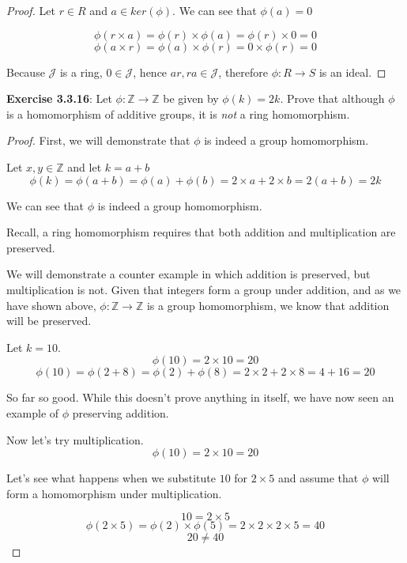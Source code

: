 \documentclass[a4paper]{article}
\begin{document}
\begin{myparindent}{0pt}
\begin{proof}
  Let $r \in R$ and $a \in ker(\phi)$. We can see that $\phi(a) = 0$

  \[ \phi(r \times a) = \phi(r) \times \phi(a) = \phi(r) \times 0 = 0 \]
  \[ \phi(a \times r) = \phi(a) \times \phi(r) = 0 \times \phi(r) = 0 \]

  Because $\mathcal{J}$ is a ring, $0 \in \mathcal{J}$, hence $ar, ra \in \mathcal{J}$,
  therefore $\phi: R \rightarrow S$ is an ideal.
\end{proof}

\textbf{Exercise 3.3.16}:
Let $\phi: \mathbb{Z} \rightarrow \mathbb{Z}$ be given by $\phi(k) = 2k$. Prove
that although $\phi$ is a homomorphism of additive groups, it is \textit{not}
a ring homomorphism.

\begin{proof}
  First, we will demonstrate that $\phi$ is indeed a group homomorphism. \newline

  Let $x, y \in \mathbb{Z}$ and let $k = a + b$
  \[ \phi(k) = \phi(a + b) = \phi(a) + \phi(b) = 2 \times a + 2 \times b =
  2(a + b) = 2k
  \]

  We can see that $\phi$ is indeed a group homomorphism. \newline

  Recall, a ring homomorphism requires that both addition and multiplication
  are preserved. \newline

  We will demonstrate a counter example in which addition is preserved, but
  multiplication is not. Given that integers form a group under addition,
  and as we have shown above, $\phi: \mathbb{Z} \rightarrow \mathbb{Z}$ is a
  group homomorphism, we know that addition will be preserved. \newline

  Let $k = 10$.
  \[ \phi(10) = 2 \times 10 = 20 \]
  \[ \phi(10) = \phi(2 + 8) = \phi(2) + \phi(8) = 2 \times 2 + 2 \times 8 = 4 + 16 = 20 \]

  So far so good. While this doesn't prove anything in itself, we have now seen an
  example of $\phi$ preserving addition. \newline

  Now let's try multiplication.
  \[ \phi(10) = 2 \times 10 = 20 \]

  Let's see what happens when we substitute $10$ for $2 \times 5$ and assume that
  $\phi$ will form a homomorphism under multiplication.

  \[ 10 = 2 \times 5 \]
  \[ \phi(2 \times 5) = \phi(2) \times \phi(5) = 2 \times 2 \times 2 \times 5 = 40 \]
  \[ 20 \neq 40 \]


\end{proof}
\end{myparindent}
\end{document}
